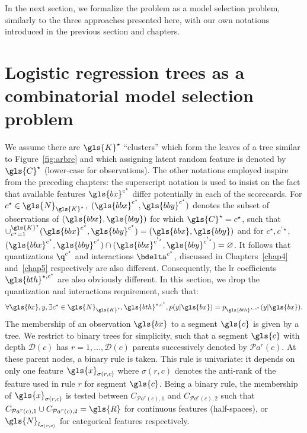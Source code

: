 In the next section, we formalize the problem as a model selection problem, similarly to the three approaches presented here, with our own notations introduced in the previous section and chapters.


\section{Logistic regression trees as a combinatorial model selection problem} \label{sec:model_selec_tree}

We assume there are $\gls{K}^\star$ ``clusters'' which form the leaves of a tree similar to Figure~\ref{fig:arbre} and which assigning latent random feature is denoted by $\gls{C}^\star$ (lower-case for observations). The other notations employed inspire from the preceding chapters: the superscript notation is used to insist on the fact that available features $\gls{bx}^{c^\star}$ differ potentially in each of the scorecards. For $c^\star \in \gls{N}_{\gls{K}^\star}$, $(\gls{bbx}^{c^\star}, \gls{bby}^{c^\star})$ denotes the subset of observations of $(\gls{bbx}, \gls{bby})$ for which $\gls{C}^\star = c^\star$, such that $\cup_{c^\star=1}^{\gls{K}^\star} (\gls{bbx}^{c^\star}, \gls{bby}^{c^\star}) = (\gls{bbx}, \gls{bby})$ and for $c^\star, c^{'\star}$, $(\gls{bbx}^{c^\star}, \gls{bby}^{c^\star}) \cap (\gls{bbx}^{c^{'\star}}, \gls{bby}^{c^{'\star}}) = \varnothing$. It follows that quantizations $\q^{c^\star}$ and interactions $\bdelta^{c^\star}$, discussed in Chapters~\ref{chap4} and~\ref{chap5} respectively are also different. Consequently, the \gls{lr} coefficients $\gls{bth}^{\star,c^\star}$ are also obviously different. In this section, we drop the quantization and interactions requirement, such that:
\begin{equation} \label{eq:lr_tree}
\forall \gls{bx}, y, \exists c^\star \in \gls{N}_{\gls{K}^\star}, \gls{bth}^{\star,c^\star}, p(y | \gls{bx}) = p_{\gls{bth}^{\star,c^\star}}(y | \gls{bx}).
\end{equation}
The membership of an observation $\gls{bx}$ to a segment $\gls{c}$ is given by a tree. We restrict to binary trees for simplicity, such that a segment $\gls{c}$ with depth $\mathcal{D}(c)$ has $r = 1, \dots, \mathcal{D}(c)$ parents successively denoted by $\mathcal{P}a^r(c)$. At these parent nodes, a binary rule is taken. This rule is univariate: it depends on only one feature $\gls{x}_{\sigma(r,c)}$ where $\sigma(r,c)$ denotes the anti-rank of the feature used in rule $r$ for segment $\gls{c}$. Being a binary rule, the membership of $\gls{x}_{\sigma(r,c)}$ is tested between $C_{\mathcal{P}a^r(c),1}$ and $C_{\mathcal{P}a^r(c),2}$ such that $C_{\mathcal{P}a^r(c),1} \cup C_{\mathcal{P}a^r(c),2} =\gls{R}$ for continuous features (half-spaces), or $\gls{N}_{l_{\sigma(r,c)}}$ for categorical features respectively. 
